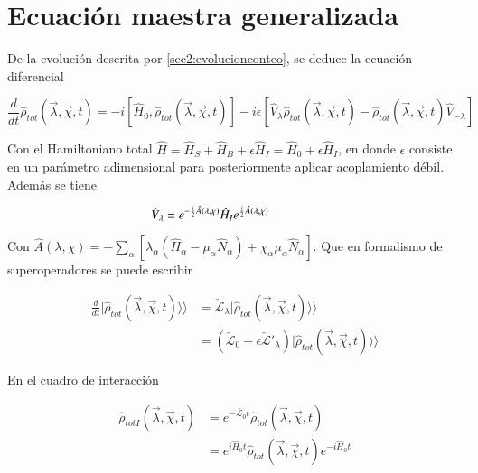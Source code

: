 \label{sec2:superop}

\newpage

\section{Ecuación maestra generalizada}
De la evolución descrita por \ref{sec2:evolucionconteo}, se deduce la ecuación diferencial

\begin{equation*}
    \frac{d}{dt}\hat{\rho}_{tot}(\vec{\lambda},\vec{\chi},t) = -i[\hat{H}_{0},\hat{\rho}_{tot}(\vec{\lambda},\vec{\chi},t)] - i\epsilon[\hat{V}_{\lambda} \hat{\rho}_{tot}(\vec{\lambda},\vec{\chi},t) - \hat{\rho}_{tot}(\vec{\lambda},\vec{\chi},t)\hat{V}_{-\lambda}]
\end{equation*}

Con el Hamiltoniano total $\hat{H} = \hat{H}_{S} + \hat{H}_{B} + \epsilon \hat{H}_{I} = \hat{H}_{0} + \epsilon \hat{H}_{I}$, en donde $\epsilon$ consiste en un parámetro adimensional para posteriormente aplicar acoplamiento débil. Además se tiene

\begin{equation*}
    \hat{V}_{\lambda} = e^{-\frac{i}{2}\hat{A}(\lambda,\chi)}\hat{H}_{I}e^{\frac{i}{2}\hat{A}(\lambda,\chi)} \hspace{14mm}  
\end{equation*}

Con $\hat{A}(\lambda,\chi) = -\sum_{\alpha}[\lambda_{\alpha}(\hat{H}_{\alpha} - \mu_{\alpha}\hat{N}_{\alpha}) + \chi_{\alpha}\mu_{\alpha}\hat{N}_{\alpha} ]$. Que en formalismo de superoperadores se puede escribir

\begin{align*}
    \frac{d}{dt}|\hat{\rho}_{tot}(\vec{\lambda},\vec{\chi},t)\rangle \rangle  & = \check{\mathcal{L}}_{\lambda}|\hat{\rho}_{tot}(\vec{\lambda},\vec{\chi},t)\rangle \rangle  \\  
        & = (\check{\mathcal{L}}_{0} + \epsilon \check{\mathcal{L}}'_{\lambda} )|\hat{\rho}_{tot}(\vec{\lambda},\vec{\chi},t)\rangle \rangle  
\end{align*}

En el cuadro de interacción 

\begin{align*}
    \hat{\rho}_{totI}(\vec{\lambda},\vec{\chi},t) & = e^{-\check{\mathcal{L}_{0}}t}\hat{\rho}_{tot}(\vec{\lambda},\vec{\chi},t) \\
    & = e^{i\hat{H}_{0}t}\hat{\rho}_{tot}(\vec{\lambda},\vec{\chi},t)e^{-i\hat{H}_{0}t}
\end{align*}


